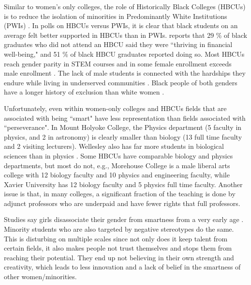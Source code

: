 \documentclass[utf8]{frontiersSCNS} %
\begin{document}
Similar to women's only colleges, the role of Historically Black Colleges (HBCUs) is to reduce the isolation of minorities in Predominantly White Institutions (PWIs) \citep{reid2012women}. In polls on HBCUs versus PWIs, it is clear that black students on an average felt better supported in HBCUs than in PWIs. \cite{seymour2015grads} reports that 29 \% of black graduates who did not attend an HBCU said they were ``thriving in financial well-being,"  and 51 \% of black HBCU graduates reported doing so. Most HBCUs reach gender parity in STEM courses and in some female enrollment exceeds male enrollment \citep{simms2014educational}. The lack of male students is connected with the hardships they endure while living in underserved communities \citep{cuyjet1997african,white2013black}. Black people of both genders have a longer history of exclusion than white women \citep{hine1997hine}.

Unfortunately, even within women-only colleges and HBCUs fields that are associated with being ``smart" have less representation than fields associated with ``perseverance". In Mount Holyoke College, the Physics department (5 faculty in physics, and 2 in astronomy) is clearly smaller than biology (13 full time faculty and 2 visiting lecturers). Wellesley  also has far more students in biological sciences than in physics \citep{Wes}. Some HBCUs have comparable biology and physics departments, but most do not, e.g., Morehouse College is a male liberal arts college with 12 biology faculty and 10 physics and engineering faculty, while Xavier University has 12 biology faculty and 5 physics full time faculty. Another issue is that, in many colleges, a significant fraction of the teaching is done by adjunct professors who are underpaid and have fewer rights that full professors. %

Studies say girls disassociate their gender from smartness from a very early age \citep{bian2018messages}. Minority students who are also targeted by negative stereotypes do the same. This is disturbing on multiple scales since not only does it keep talent from certain fields, it also makes people not trust themselves and stops them from reaching their potential. They end up not believing in their own strength and creativity, which leads to less innovation and a lack of belief in the smartness of other women/minorities. 
\end{document}
